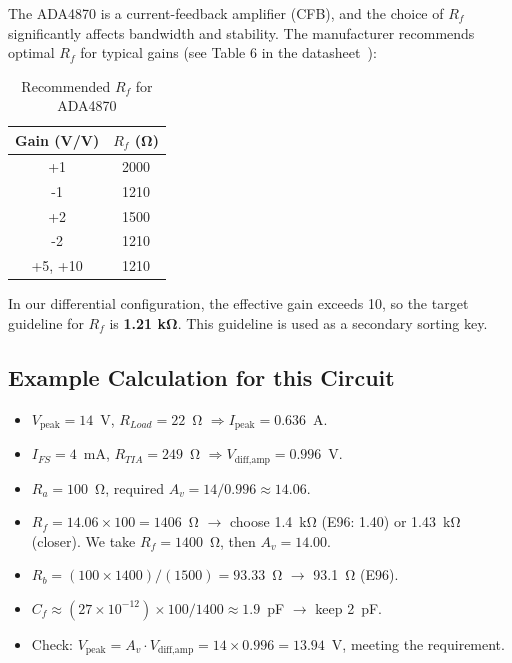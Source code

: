 \documentclass[a4paper, 12pt]{article}
\begin{document}
The ADA4870 is a current-feedback amplifier (CFB), and the choice of \(R_f\)
significantly affects bandwidth and stability. The manufacturer recommends
optimal \(R_f\) for typical gains (see Table 6 in the datasheet~\cite{ADA4870_ds}):

\begin{table}[H]
\centering
\caption{Recommended \(R_f\) for ADA4870}
\label{tab:rf_rec}
\begin{tabular}{@{}cc@{}}
\toprule
\textbf{Gain (V/V)} & \textbf{\(R_f\) (Ω)} \\
\midrule
+1  & 2000 \\
-1  & 1210 \\
+2  & 1500 \\
-2  & 1210 \\
+5, +10 & 1210 \\
\bottomrule
\end{tabular}
\end{table}

In our differential configuration, the effective gain exceeds 10, so the target
guideline for \(R_f\) is \textbf{1.21 kΩ}. This guideline is used as a secondary
sorting key.

\subsection{Example Calculation for this Circuit}
\label{sec:example_calc}

\begin{itemize}
    \item \(V_{\text{peak}} = 14\)~V, \(R_{Load} = 22\)~Ω $\Rightarrow I_{\text{peak}} = 0.636$~A.
    \item \(I_{FS} = 4\)~mA, \(R_{TIA} = 249\)~Ω $\Rightarrow V_{\text{diff,amp}} = 0.996$~V.
    \item \(R_a = 100\)~Ω, required \(A_v = 14 / 0.996 \approx 14.06\).
    \item \(R_f = 14.06 \times 100 = 1406\)~Ω $\to$ choose 1.4~kΩ (E96: 1.40) or 1.43~kΩ (closer).
        We take \(R_f = 1400\)~Ω, then \(A_v = 14.00\).
    \item \(R_b = (100 \times 1400)/(1500) = 93.33\)~Ω $\to$ 93.1~Ω (E96).
    \item \(C_f \approx (27\times10^{-12}) \times 100 / 1400 \approx 1.9\)~pF $\to$ keep 2~pF.
    \item Check: \(V_{\text{peak}} = A_v \cdot V_{\text{diff,amp}} = 14 \times 0.996 = 13.94\)~V,
        meeting the requirement.
\end{itemize}
\end{document}

